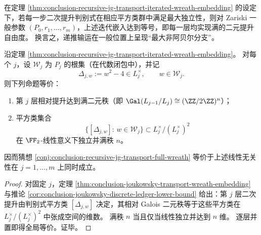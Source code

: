 \begin{conjecture}\label{conj:conclusion-recursive-jg-transport-full-wreath}
在定理 \ref{thm:conclusion-recursive-jg-transport-iterated-wreath-embedding} 的设定下，若每一步二次提升判别式在相应平方类群中满足最大独立性，则对 Zariski 一般参数 \((P_0,r_1,\dots,r_m)\)，上述迭代嵌入达到等号，即每一层均实现满的二元提升自由度。
换言之，递推输运在一般位置上呈现“最大非阿贝尔分支”。
\end{conjecture}

\begin{proposition}\label{prop:conclusion-recursive-jg-transport-squareclass-criterion}
沿定理 \ref{thm:conclusion-recursive-jg-transport-iterated-wreath-embedding}。
对每个 \(j\)，设 \(\mathcal W_j\) 为 \(P_j\) 的根集（在代数闭包中），并记
\[
\Delta_{j,w}:=w^2-4\in L_j^\times,\qquad w\in\mathcal W_j.
\]
则下列命题等价：
\begin{enumerate}
  \item 第 \(j\) 层相对提升达到满二元秩（即 \(\Gal(L_{j-1}/L_j)\cong(\ZZ/2\ZZ)^n\)）；
  \item 平方类集合
  \[
  \{[\Delta_{j,w}]:\,w\in\mathcal W_j\}\subset L_j^\times/(L_j^\times)^2
  \]
  在 \(\FF_2\)-线性意义下独立并满秩 \(n\)。
\end{enumerate}
因而猜想 \ref{conj:conclusion-recursive-jg-transport-full-wreath} 等价于上述线性无关性在 \(j=1,\dots,m\) 上同时成立。
\end{proposition}
\begin{proof}
对固定 \(j\)，定理 \ref{thm:conclusion-joukowsky-transport-wreath-embedding} 与推论 \ref{cor:conclusion-joukowsky-discrete-ledger-lower-bound} 给出：第 \(j\) 层二次提升由判别式平方类 \([\Delta_{j,w}]\) 决定，其相对 Galois 二元秩等于这些平方类在
\(
L_j^\times/(L_j^\times)^2
\)
中张成空间的维数。
满秩 \(n\) 当且仅当线性独立并达到 \(n\) 维。
逐层并置即得全局等价。证毕。
\end{proof}

